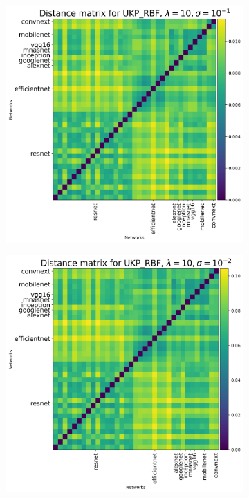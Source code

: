 \documentclass{article}
\theoremstyle{plain}
\begin{document}
\begin{figure}[!h]
    \begin{subfigure}[b]{0.3\textwidth}
        \includegraphics[width=\textwidth]{Appendix figures/imagenet_experiments/Heatmaps final/Heatmap for UKP_dist_RBF_1.000000e+01_1.000000e-01.png}
    \end{subfigure}
    \hfill
    \begin{subfigure}[b]{0.3\textwidth}
        \includegraphics[width=\textwidth]{Appendix figures/imagenet_experiments/Heatmaps final/Heatmap for UKP_dist_RBF_1.000000e+01_1.000000e-02.png}

\end{subfigure}
\end{figure}
\end{document}
